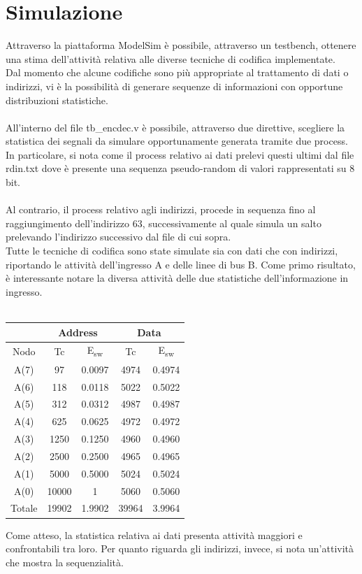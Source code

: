 \documentclass[11pt,  english, makeidx, a4paper, titlepage, oneside]{book}
\begin{document}
\section{Simulazione}
Attraverso la piattaforma ModelSim è possibile, attraverso un testbench, ottenere una stima dell'attività relativa alle diverse tecniche di codifica implementate.
\\
Dal momento che alcune codifiche sono più appropriate al trattamento di dati o indirizzi, vi è la possibilità di generare sequenze di informazioni con opportune distribuzioni statistiche.
\\\\
All'interno del file tb\_encdec.v è possibile, attraverso due direttive, scegliere la statistica dei segnali da simulare opportunamente generata tramite due process. In particolare, si nota come il process relativo ai dati prelevi questi ultimi dal file rdin.txt dove è presente una sequenza pseudo-random di valori rappresentati su 8 bit.
\\\\
Al contrario, il process relativo agli indirizzi, procede in sequenza fino al raggiungimento dell'indirizzo 63, successivamente al quale simula un salto prelevando l'indirizzo successivo dal file di cui sopra.
\\
Tutte le tecniche di codifica sono state simulate sia con dati che con indirizzi, riportando le attività dell'ingresso A e delle linee di bus B. Come primo risultato, è interessante notare la diversa attività delle due statistiche dell'informazione in ingresso.
\\\\
\begin{center}
	\begin{tabular}{|c|c|c|c|c|}
	\hline
	& \multicolumn{2}{c}{Address} & \multicolumn{2}{c}{Data}\\
	\hline
	Nodo & Tc & E\textsubscript{sw} & Tc & E\textsubscript{sw} \\
	\hline
	 A(7) & 97 & 0.0097 & 4974 & 0.4974\\
	 \hline
	A(6) & 118 & 0.0118 & 5022 & 0.5022\\
	\hline
	A(5) & 312 & 0.0312 & 4987 & 0.4987\\
	\hline
	A(4) & 625 & 0.0625 & 4972 & 0.4972\\
	\hline
	A(3) & 1250 & 0.1250 & 4960 & 0.4960\\
	\hline
	A(2) & 2500 & 0.2500 & 4965 & 0.4965\\
	\hline
	A(1) & 5000 & 0.5000 & 5024 & 0.5024\\
	\hline
	A(0) & 10000 & 1 & 5060 & 0.5060\\
	\hline
	Totale & 19902 & 1.9902 & 39964 & 3.9964\\
	\hline
	\end{tabular}	
\end{center}
\vspace{0.3cm}
Come atteso, la statistica relativa ai dati presenta attività maggiori e confrontabili tra loro. Per quanto riguarda gli indirizzi, invece, si nota un'attività che mostra la sequenzialità.
\end{document}
